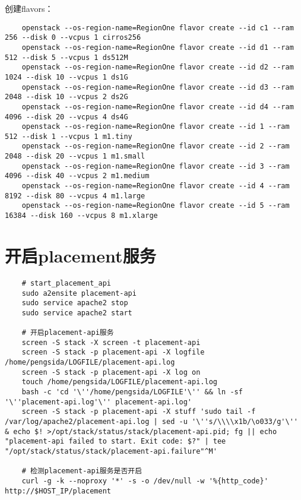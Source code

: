 \documentclass[a4paper,left=1.5cm,right=1.5cm,11pt]{article}
\begin{document}
	创建flavors：
	\begin{lstlisting}
	openstack --os-region-name=RegionOne flavor create --id c1 --ram 256 --disk 0 --vcpus 1 cirros256
	openstack --os-region-name=RegionOne flavor create --id d1 --ram 512 --disk 5 --vcpus 1 ds512M
	openstack --os-region-name=RegionOne flavor create --id d2 --ram 1024 --disk 10 --vcpus 1 ds1G
	openstack --os-region-name=RegionOne flavor create --id d3 --ram 2048 --disk 10 --vcpus 2 ds2G
	openstack --os-region-name=RegionOne flavor create --id d4 --ram 4096 --disk 20 --vcpus 4 ds4G
	openstack --os-region-name=RegionOne flavor create --id 1 --ram 512 --disk 1 --vcpus 1 m1.tiny
	openstack --os-region-name=RegionOne flavor create --id 2 --ram 2048 --disk 20 --vcpus 1 m1.small
	openstack --os-region-name=RegionOne flavor create --id 3 --ram 4096 --disk 40 --vcpus 2 m1.medium
	openstack --os-region-name=RegionOne flavor create --id 4 --ram 8192 --disk 80 --vcpus 4 m1.large
	openstack --os-region-name=RegionOne flavor create --id 5 --ram 16384 --disk 160 --vcpus 8 m1.xlarge
	\end{lstlisting}

\section{开启placement服务}
	\begin{lstlisting}
	# start_placement_api
	sudo a2ensite placement-api
	sudo service apache2 stop
	sudo service apache2 start

	# 开启placement-api服务
	screen -S stack -X screen -t placement-api
	screen -S stack -p placement-api -X logfile /home/pengsida/LOGFILE/placement-api.log
    screen -S stack -p placement-api -X log on
	touch /home/pengsida/LOGFILE/placement-api.log
    bash -c 'cd '\''/home/pengsida/LOGFILE'\'' && ln -sf '\''placement-api.log'\'' placement-api.log'
	screen -S stack -p placement-api -X stuff 'sudo tail -f /var/log/apache2/placement-api.log | sed -u '\''s/\\\\x1b/\o033/g'\'' & echo $! >/opt/stack/status/stack/placement-api.pid; fg || echo "placement-api failed to start. Exit code: $?" | tee "/opt/stack/status/stack/placement-api.failure"^M'

	# 检测placement-api服务是否开启
	curl -g -k --noproxy '*' -s -o /dev/null -w '%{http_code}' http://$HOST_IP/placement
	\end{lstlisting}
\end{document}
